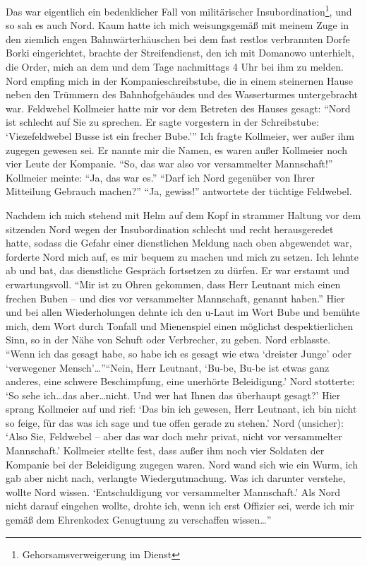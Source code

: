 \documentclass[a5paper,pagesize,10pt,twoside=true]{scrbook}
\begin{document}
Das war eigentlich ein bedenklicher Fall von militärischer Insubordination\footnote{Gehorsamsverweigerung im Dienst}, und so sah es auch Nord. Kaum hatte ich mich weisungsgemäß mit meinem Zuge in den ziemlich engen Bahnwärterhäuschen bei dem fast restlos verbrannten Dorfe Borki eingerichtet, brachte der Streifendienst, den ich mit Domanowo unterhielt, die Order, mich an dem und dem Tage nachmittags 4 Uhr bei ihm zu melden. Nord empfing mich in der Kompanieschreibstube, die in einem steinernen Hause neben den Trümmern des Bahnhofgebäudes und des Wasserturmes untergebracht war. Feldwebel Kollmeier hatte mir vor dem Betreten des Hauses gesagt: \enquote{Nord ist schlecht auf Sie zu sprechen. Er sagte vorgestern in der Schreibstube: \enquote{Viezefeldwebel Busse ist ein frecher Bube.}} Ich fragte Kollmeier, wer außer ihm zugegen gewesen sei. Er nannte mir die Namen, es waren außer Kollmeier noch vier Leute der Kompanie. \enquote{So, das war also vor versammelter Mannschaft!} Kollmeier meinte: \enquote{Ja, das war es.} \enquote{Darf ich Nord gegenüber von Ihrer Mitteilung Gebrauch machen?} \enquote{Ja, gewiss!} antwortete der tüchtige Feldwebel.

Nachdem ich mich stehend mit Helm auf dem Kopf in strammer Haltung vor dem sitzenden Nord wegen der Insubordination schlecht und recht herausgeredet hatte, sodass die Gefahr einer dienstlichen Meldung nach oben abgewendet war, forderte Nord mich auf, es mir bequem zu machen und mich zu setzen. Ich lehnte ab und bat, das dienstliche Gespräch fortsetzen zu dürfen. Er war erstaunt und erwartungsvoll. \enquote{Mir ist zu Ohren gekommen, dass Herr Leutnant mich einen frechen Buben -- und dies vor versammelter Mannschaft, genannt haben.} Hier und bei allen Wiederholungen dehnte ich den u-Laut im Wort Bube und bemühte mich, dem Wort durch Tonfall und Mienenspiel einen möglichst despektierlichen Sinn, so in der Nähe von Schuft oder Verbrecher, zu geben. Nord erblasste. \enquote{Wenn ich das gesagt habe, so habe ich es gesagt wie etwa \enquote{dreister Junge} oder \enquote{verwegener Mensch}\dots}\enquote{Nein, Herr Leutnant, \enquote{Bu-be, Bu-be ist etwas ganz anderes, eine schwere Beschimpfung, eine unerhörte Beleidigung.} Nord stotterte: \enquote{So sehe ich\dots das aber\dots nicht. Und wer hat Ihnen das überhaupt gesagt?} Hier sprang Kollmeier auf und rief: \enquote{Das bin ich gewesen, Herr Leutnant, ich bin nicht so feige, für das was ich sage und tue offen gerade zu stehen.} Nord (unsicher): \enquote{Also Sie, Feldwebel -- aber das war doch mehr privat, nicht vor versammelter Mannschaft.} Kollmeier stellte fest, dass außer ihm noch vier Soldaten der Kompanie bei der Beleidigung zugegen waren. Nord wand sich wie ein Wurm, ich gab aber nicht nach, verlangte Wiedergutmachung. Was ich darunter verstehe, wollte Nord wissen. \enquote{Entschuldigung vor versammelter Mannschaft.} Als Nord nicht darauf eingehen wollte, drohte ich, wenn ich erst Offizier sei, werde ich mir gemäß dem Ehrenkodex Genugtuung zu verschaffen wissen\dots}
\end{document}
